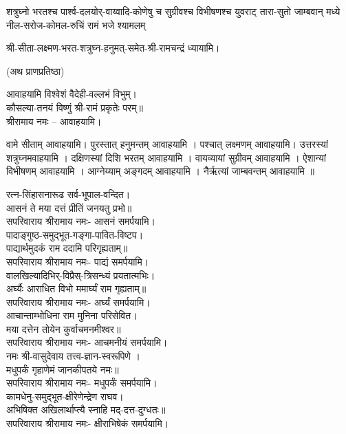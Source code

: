 {शत्रुघ्नो भरतश्च पार्श्व-दलयोर्-वाय्वादि-कोणेषु च}
{सुग्रीवश्च विभीषणश्च युवराट् तारा-सुतो जाम्बवान्}
{मध्ये नील-सरोज-कोमल-रुचिं रामं भजे श्यामलम्}

श्री-सीता-लक्ष्मण-भरत-शत्रुघ्न-हनुमत्-समेत-श्री-रामचन्द्रं ध्यायामि।

(अथ प्राणप्रतिष्ठा)


आवाहयामि विश्वेशं वैदेही-वल्लभं विभुम्।\\
कौसल्या-तनयं विष्णुं श्री-रामं प्रकृतेः परम्॥\\
श्रीरामाय नमः – आवाहयामि।

वामे सीताम् आवाहयामि।
पुरस्तात् हनुमन्तम् आवाहयामि ।
पश्चात् लक्ष्मणम् आवाहयामि।
उत्तरस्यां शत्रुघ्नमवाहयामि ।
दक्षिणस्यां दिशि भरतम् आवाहयामि ।
वायव्यायां सुग्रीवम् आवाहयामि ।
ऐशान्यां विभीषणम् आवाहयामि ।
आग्नेय्याम् अङ्गदम् आवाहयामि ।
नैर्ऋत्यां जाम्बवन्तम् आवाहयामि ॥

\newcommand{\namah}{सपरिवाराय श्रीरामाय नमः}

रत्न-सिंहासनारूढ सर्व-भूपाल-वन्दित।\\
आसनं ते मया दत्तं प्रीतिं जनयतु प्रभो॥\\
\namah - आसनं समर्पयामि।\\

पादाङ्गुष्ठ-समुद्भूत-गङ्गा-पावित-विष्टप।\\
पाद्यार्थमुदकं राम ददामि परिगृह्यताम्॥\\
\namah - पाद्यं समर्पयामि।\\

वालखिल्यादिभिर्-विप्रैस्-त्रिसन्ध्यं प्रयतात्मभिः।\\
अर्घ्यैः आराधित विभो ममार्घ्यं राम गृह्यताम्॥\\
\namah - अर्घ्यं समर्पयामि।\\

आचान्ताम्भोधिना राम मुनिना परिसेवित।\\
मया दत्तेन तोयेन कुर्वाचमनमीश्वर॥\\
\namah - आचमनीयं समर्पयामि।\\

नमः श्री-वासुदेवाय तत्त्व-ज्ञान-स्वरूपिणे ।\\
मधुपर्कं गृहाणेमं जानकीपतये नमः॥\\
\namah - मधुपर्कं समर्पयामि।\\

कामधेनु-समुद्भूत-क्षीरेणेन्द्रेण राघव।\\
अभिषिक्त अखिलार्थाप्त्यै स्नाहि मद्-दत्त-दुग्धतः॥\\
\namah - क्षीराभिषेकं समर्पयामि।\\

